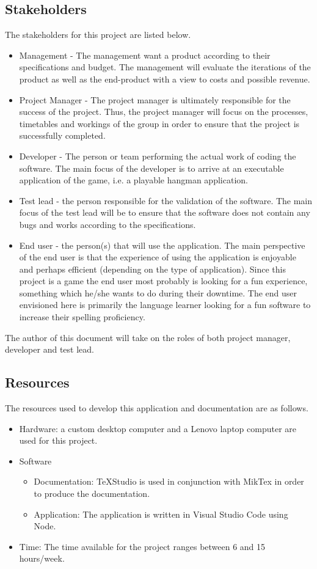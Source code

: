 \documentclass[12pt, letterpaper]{article}
\begin{document}
\subsection{Stakeholders}
The stakeholders for this project are listed below.
\begin{itemize}
	\item Management - The management want a product according to their specifications and budget. The management will evaluate the iterations of the product as well as the end-product with a view to costs and possible revenue.
	\item Project Manager - The project manager is ultimately responsible for the success of the project. Thus, the project manager will focus on the processes, timetables and workings of the group in order to ensure that the project is successfully completed. 
	\item Developer - The person or team performing the actual work of coding the software. The main focus of the developer is to arrive at an executable application of the game, i.e. a playable hangman application.
	\item Test lead - the person responsible for the validation of the software. The main focus of the test lead will be to ensure that the software does not contain any bugs and works according to the specifications.
	\item End user - the person(s) that will use the application. The main perspective of the end user is that the experience of using the application is enjoyable and perhaps efficient (depending on the type of application). Since this project is a game the end user most probably is looking for a fun experience, something which he/she wants to do during their downtime. The end user envisioned here is primarily the language learner looking for a fun software to increase their spelling proficiency. 
\end{itemize}
The author of this document will take on the roles of both project manager, developer and test lead.
\subsection{Resources}
The resources used to develop this application and documentation are as follows.
\begin{itemize}
	\item Hardware: a custom desktop computer and a Lenovo laptop computer are used for this project.
	\item Software
	\begin{itemize}
		\item Documentation: TeXStudio is used in conjunction with MikTex in order to produce the documentation.
		\item Application: The application is written in Visual Studio Code using Node.
	\end{itemize}
	\item Time: The time available for the project ranges between 6 and 15 hours/week.
\end{itemize}
\end{document}
